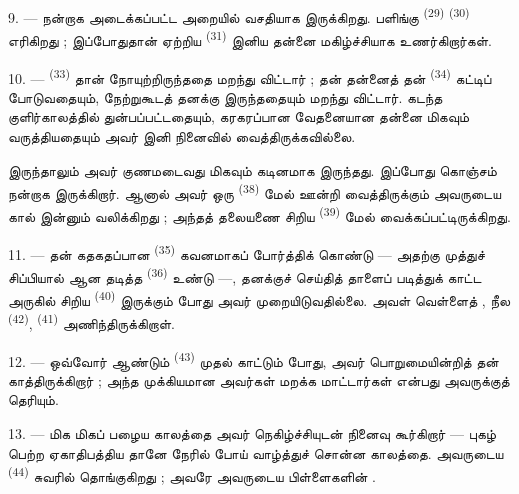 9. --- நன்றாக அடைக்கப்பட்ட அறையில் வசதியாக இருக்கிறது. பளிங்கு
 \textsuperscript{(29)} 
\textsuperscript{(30)} எரிகிறது ; இப்போதுதான் ஏற்றிய 
\textsuperscript{(31)} இனிய  தன்னை மகிழ்ச்சியாக உணர்கிறார்கள்.

\VUsaut{4.2mm}
\VUsaut{3.0mm}

10. ---  \textsuperscript{(33)} தான் நோயுற்றிருந்ததை
மறந்து விட்டார் ; தன்  தன்னைத் தன்  \textsuperscript{(34)} கட்டிப் போடுவதையும், நேற்றுகூடத் தனக்கு
 இருந்ததையும் மறந்து விட்டார். கடந்த
குளிர்காலத்தில்  துன்பப்பட்டதையும், கரகரப்பான
வேதனையான  தன்னை மிகவும் வருத்தியதையும் அவர் இனி
நினைவில் வைத்திருக்கவில்லை.

இருந்தாலும் அவர் குணமடைவது மிகவும் கடினமாக இருந்தது. இப்போது கொஞ்சம்
நன்றாக இருக்கிறார். ஆனால் அவர் ஒரு  \textsuperscript{(38)}
மேல் ஊன்றி வைத்திருக்கும் அவருடைய கால் இன்னும் வலிக்கிறது ; அந்தத்
தலையணை சிறிய  \textsuperscript{(39)} மேல்
வைக்கப்பட்டிருக்கிறது.

11. --- தன் கதகதப்பான  \textsuperscript{(35)}
கவனமாகப் போர்த்திக் கொண்டு — அதற்கு முத்துச் சிப்பியால் ஆன தடித்த
 \textsuperscript{(36)} உண்டு —, தனக்குச் செய்தித்
தாளைப் படித்துக் காட்ட அருகில் சிறிய 
\textsuperscript{(40)} இருக்கும் போது அவர் முறையிடுவதில்லை. அவள்
வெள்ளைத் , நீல  \textsuperscript{(42)},
 \textsuperscript{(41)} அணிந்திருக்கிறாள்.

12. --- ஒவ்வோர் ஆண்டும்  \textsuperscript{(43)}
 முதல்  காட்டும் போது, அவர் பொறுமையின்றித்
தன்  காத்திருக்கிறார் ; அந்த முக்கியமான
 அவர்கள் மறக்க மாட்டார்கள் என்பது அவருக்குத் தெரியும்.

13. --- மிக மிகப் பழைய காலத்தை அவர் நெகிழ்ச்சியுடன் நினைவு கூர்கிறார் —
புகழ் பெற்ற ஏகாதிபத்திய  தானே நேரில் போய்
வாழ்த்துச் சொன்ன காலத்தை. அவருடைய  \textsuperscript{(44)}
சுவரில் தொங்குகிறது ; அவரே அவருடைய பிள்ளைகளின் .

\VUsaut{6.0mm}
\VUfilet{22mm}
